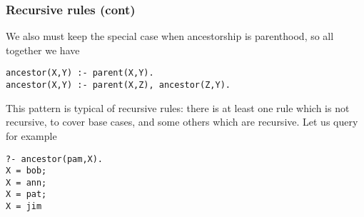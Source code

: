 %
\begin{frame}[containsverbatim]
\frametitle{Recursive rules (cont)}

\label{ancestor}

We also must keep the special case when ancestorship is parenthood, so
all together we have
{\small
\begin{verbatim}
ancestor(X,Y) :- parent(X,Y).
ancestor(X,Y) :- parent(X,Z), ancestor(Z,Y).
\end{verbatim}
} 
This pattern is typical of recursive rules: there is at least one rule
which is not recursive, to cover base cases, and some others which are
recursive. Let us query for example
{\small
\begin{verbatim}
?- ancestor(pam,X).
X = bob;
X = ann;
X = pat;
X = jim
\end{verbatim}
}

\end{frame}
